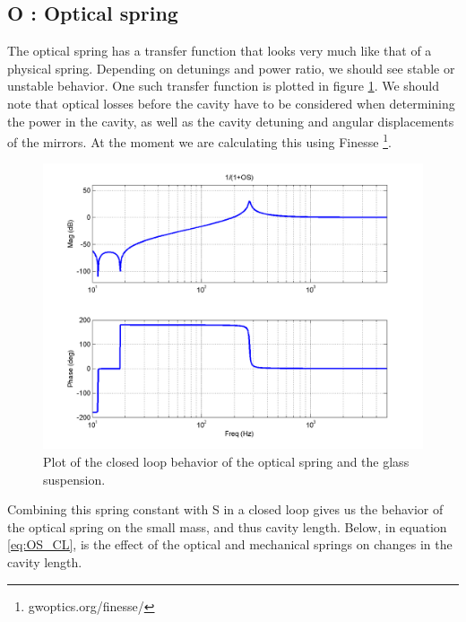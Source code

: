 \subsection{O : Optical spring}

The optical spring has a transfer function that looks very much like that of a physical spring. Depending on detunings and power ratio, we should see stable or unstable behavior. One such transfer function is plotted in figure \ref{fig:O}.  We should note that optical losses before the cavity have to be considered when determining the power in the cavity, as well as the cavity detuning and angular displacements of the mirrors.  At the moment we are calculating this using Finesse \footnote{gwoptics.org/finesse/}.

\begin{figure}%
\includegraphics[width=\columnwidth]{figures/controls/O.png}%
\caption[Optical spring]{Plot of the closed loop behavior of the optical spring and the glass suspension.  
}
\label{fig:O}%
\end{figure}

Combining this spring constant with S in a closed loop gives us the behavior of the optical spring on the small mass, and thus cavity length.  Below, in equation \ref{eq:OS_CL}, is the effect of the optical and mechanical springs on changes in the cavity length.

